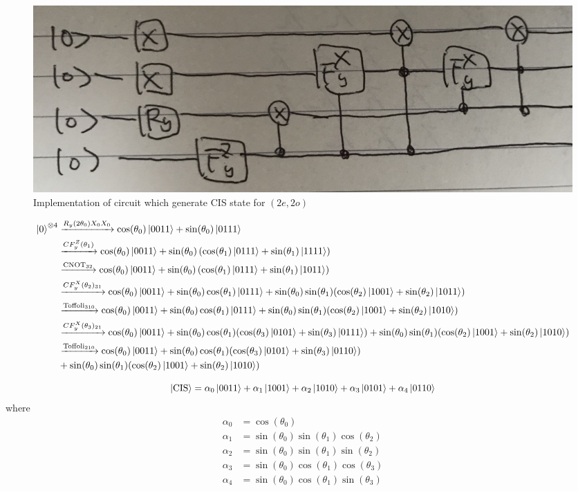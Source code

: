 \documentclass[11pt, oneside]{article}   	%
\begin{document}
\begin{figure}
\centering
\includegraphics[width=0.75 \linewidth]{figs/fig_cis_circuit_2e_2o}
\caption{Implementation of circuit which generate CIS state for $(2e, 2o)$}
\end{figure}

\begin{align*}
\ket{0}^{\otimes 4} 
&\xrightarrow{R_y(2 \theta_0) X_0 X_0} \cos(\theta_0) \ket{0011} + \sin(\theta_0) \ket{0111} \\
&\xrightarrow{CF^Z_y(\theta_1)} \cos(\theta_0) \ket{0011} + \sin(\theta_0) \left( \cos(\theta_1) \ket{0111} + \sin(\theta_1) \ket{1111} \right) \\
&\xrightarrow{\text{CNOT}_{32}} \cos(\theta_0) \ket{0011} + \sin(\theta_0) \left( \cos(\theta_1) \ket{0111} + \sin(\theta_1) \ket{1011} \right) \\
&\xrightarrow{CF^X_y(\theta_2)_{31}} 
\cos(\theta_0) \ket{0011} 
+ \sin(\theta_0) \cos(\theta_1) \ket{0111} 
+ \sin(\theta_0) \sin(\theta_1) (\cos(\theta_2) \ket{1001} + \sin(\theta_2) \ket{1011}) \\
&\xrightarrow{\text{Toffoli}_{310}} 
\cos(\theta_0) \ket{0011} 
+ \sin(\theta_0) \cos(\theta_1) \ket{0111} 
+ \sin(\theta_0) \sin(\theta_1) (\cos(\theta_2) \ket{1001} + \sin(\theta_2) \ket{1010}) \\
&\xrightarrow{CF^X_y(\theta_3)_{21}} 
\cos(\theta_0) \ket{0011} 
+ \sin(\theta_0) \cos(\theta_1) (\cos(\theta_3) \ket{0101} + \sin(\theta_3) \ket{0111})
+ \sin(\theta_0) \sin(\theta_1) (\cos(\theta_2) \ket{1001} + \sin(\theta_2) \ket{1010}) \\
&\xrightarrow{\text{Toffoli}_{210}}
\cos(\theta_0) \ket{0011} 
+ \sin(\theta_0) \cos(\theta_1) (\cos(\theta_3) \ket{0101} + \sin(\theta_3) \ket{0110}) \\
&+ \sin(\theta_0) \sin(\theta_1) (\cos(\theta_2) \ket{1001} + \sin(\theta_2) \ket{1010})
\end{align*}

\begin{equation}
\ket{\text{CIS}} 
= \alpha_0 \ket{0011} 
+ \alpha_1 \ket{1001}
+ \alpha_2 \ket{1010}
+ \alpha_3 \ket{0101} 
+ \alpha_4 \ket{0110} 
\end{equation}
where
\begin{align*}
\alpha_0 &= \cos(\theta_0) \\
\alpha_1 &= \sin(\theta_0) \sin(\theta_1) \cos(\theta_2) \\
\alpha_2 &= \sin(\theta_0) \sin(\theta_1) \sin(\theta_2) \\
\alpha_3 &= \sin(\theta_0) \cos(\theta_1) \cos(\theta_3) \\
\alpha_4 &= \sin(\theta_0) \cos(\theta_1) \sin(\theta_3)
\end{align*}
\end{document}
